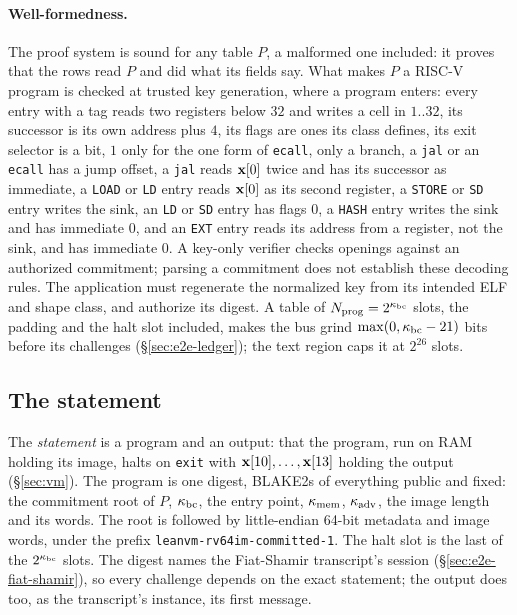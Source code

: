 \paragraph{Well-formedness.} The proof system is sound for any table $P$, a malformed one included: it proves that the rows read $P$ and did what its fields say. What makes $P$ a RISC-V program is checked at trusted key generation, where a program enters: every entry with a tag reads two registers below $32$ and writes a cell in $1..32$, its successor is its own address plus $4$, its flags are ones its class defines, its exit selector is a bit, $1$ only for the one form of \texttt{ecall}, only a branch, a \texttt{jal} or an \texttt{ecall} has a jump offset, a \texttt{jal} reads $\mathbf{x}[0]$ twice and has its successor as immediate, a \texttt{LOAD} or \texttt{LD} entry reads $\mathbf{x}[0]$ as its second register, a \texttt{STORE} or \texttt{SD} entry writes the sink, an \texttt{LD} or \texttt{SD} entry has flags $0$, a \texttt{HASH} entry writes the sink and has immediate $0$, and an \texttt{EXT} entry reads its address from a register, not the sink, and has immediate $0$. A key-only verifier checks openings against an authorized commitment; parsing a commitment does not establish these decoding rules. The application must regenerate the normalized key from its intended ELF and shape class, and authorize its digest. A table of $N_{\mathrm{prog}}=2^{\kappa_{\mathrm{bc}}}$ slots, the padding and the halt slot included, makes the bus grind $\max(0,\kappa_{\mathrm{bc}}-21)$ bits before its challenges (\S\ref{sec:e2e-ledger}); the text region caps it at $2^{26}$ slots.

\subsection{The statement}\label{sec:e2e-pi}

The \emph{statement} is a program and an output: that the program, run on RAM holding its image, halts on \texttt{exit} with $\mathbf{x}[10],\dots,\mathbf{x}[13]$ holding the output (\S\ref{sec:vm}). The program is one digest, BLAKE2s of everything public and fixed: the commitment root of $P$, $\kappa_{\mathrm{bc}}$, the entry point, $\kappa_{\mathrm{mem}}$, $\kappa_{\mathrm{adv}}$, the image length and its words. The root is followed by little-endian 64-bit metadata and image words, under the prefix \texttt{leanvm-rv64im-committed-1}. The halt slot is the last of the $2^{\kappa_{\mathrm{bc}}}$ slots. The digest names the Fiat-Shamir transcript's session (\S\ref{sec:e2e-fiat-shamir}), so every challenge depends on the exact statement; the output does too, as the transcript's instance, its first message.

